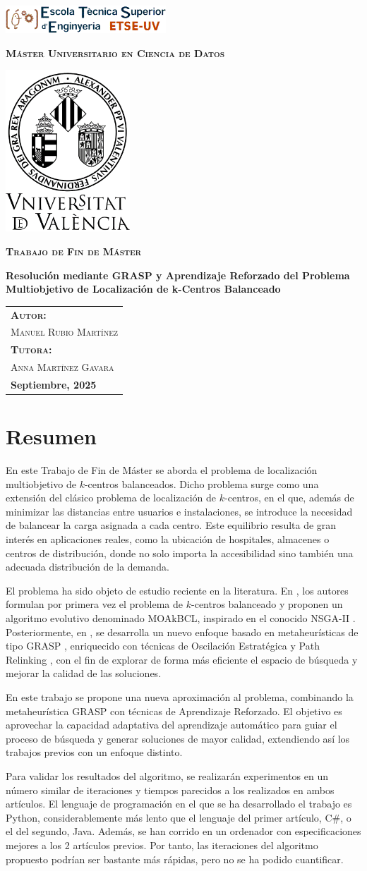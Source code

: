 \documentclass[12pt,a4paper]{book}
\newcommand{\nuevaportada}[6]{
    \thispagestyle{empty}
    \begin{center}
        \vfill 
        
        \includegraphics[width=0.45\textwidth]{images/logo.png}
        
        \vspace{0.5cm} %
        {\large\bfseries\textsc{M\'aster Universitario en #1}\par} %
        
        \vspace{0.5cm}
        \includegraphics[width=0.35\textwidth]{images/uv.png} %
        
        \vspace{0.5cm}
        {\large\bfseries\textsc{Trabajo de Fin de M\'aster}\par} %
        
        \vfill 
        
        {\LARGE\bfseries #2\par} %
        
        \vfill %
        
        \begin{flushright}
            \begin{tabular}{l} 
                {\large\bfseries\textsc{Autor:}} \\
                {\large\textsc{#3}} \\ [0.2cm] %
                {\large\bfseries\textsc{Tutora:}} \\ 
                {\large\textsc{#4}} \\ [0.2cm] %
                {\large\bfseries #5} 
            \end{tabular}
        \end{flushright}
        
        \vfill %
    \end{center}
}
\begin{document}
\nuevaportada{Ciencia de Datos}{Resolución mediante GRASP y Aprendizaje Reforzado del Problema Multiobjetivo de Localización de k-Centros Balanceado }{Manuel Rubio Martínez}{Anna Martínez Gavara}{Septiembre, 2025}

\clearpage

\newpage
\tableofcontents

\newpage

\section*{Resumen}
En este Trabajo de Fin de Máster se aborda el problema de localización multiobjetivo de $k$-centros balanceados. Dicho problema surge como una extensión del clásico problema de localización de $k$-centros, en el que, además de minimizar las distancias entre usuarios e instalaciones, se introduce la necesidad de balancear la carga asignada a cada centro. Este equilibrio resulta de gran interés en aplicaciones reales, como la ubicación de hospitales, almacenes o centros de distribución, donde no solo importa la accesibilidad sino también una adecuada distribución de la demanda.

El problema ha sido objeto de estudio reciente en la literatura. En \cite{k-balanced_1}, los autores formulan por primera vez el problema de $k$-centros balanceado y proponen un algoritmo evolutivo denominado MOAkBCL, inspirado en el conocido NSGA-II \citep{NSGA-II}. Posteriormente, en \cite{k-Balanced_2}, se desarrolla un nuevo enfoque basado en metaheurísticas de tipo GRASP \citep{GRASP}, enriquecido con técnicas de Oscilación Estratégica \citep{oscillation} y Path Relinking \citep{path_relinking}, con el fin de explorar de forma más eficiente el espacio de búsqueda y mejorar la calidad de las soluciones.

En este trabajo se propone una nueva aproximación al problema, combinando la metaheurística GRASP con técnicas de Aprendizaje Reforzado. El objetivo es aprovechar la capacidad adaptativa del aprendizaje automático para guiar el proceso de búsqueda y generar soluciones de mayor calidad, extendiendo así los trabajos previos con un enfoque distinto. 

Para validar los resultados del algoritmo, se realizarán experimentos en un número similar de iteraciones y tiempos parecidos a los realizados en ambos artículos. El lenguaje de programación en el que se ha desarrollado el trabajo es Python, considerablemente más lento que el lenguaje del primer artículo, C\#, o el del segundo, Java. Además, se han corrido en un ordenador con especificaciones mejores a los 2 artículos previos. Por tanto, las iteraciones del algoritmo propuesto podrían ser bastante
más rápidas, pero no se ha podido cuantificar.
\newpage
\end{document}
